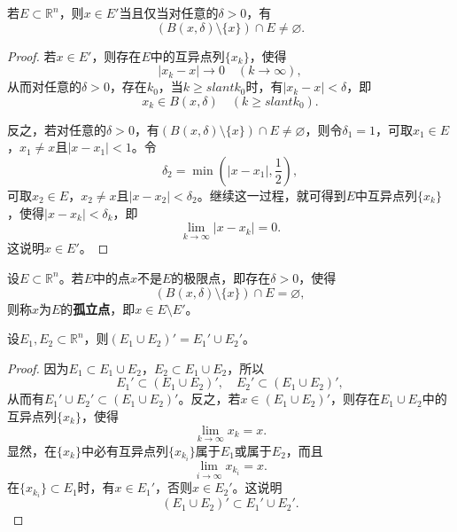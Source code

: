 \documentclass[../../main.tex]{subfiles}
\begin{document}
\begin{theorem}[一个点是极限点的充要条件]\label{theorem:一个点是极限点的充要条件}
若\(E\subset\mathbb{R}^n\)，则\(x\in E'\)当且仅当对任意的\(\delta>0\)，有
\[(B(x,\delta)\setminus\{x\})\cap E\neq\varnothing.\]
\end{theorem}
\begin{proof}
  若\(x\in E'\)，则存在\(E\)中的互异点列\(\{x_k\}\)，使得
\[|x_k - x|\to 0\quad(k\to\infty),\]
从而对任意的\(\delta>0\)，存在\(k_0\)，当\(k\geqslant slant k_0\)时，有\(|x_k - x|<\delta\)，即
\[x_k\in B(x,\delta)\quad(k\geqslant slant k_0).\]

反之，若对任意的\(\delta>0\)，有\((B(x,\delta)\setminus\{x\})\cap E\neq\varnothing\)，则令\(\delta_1 = 1\)，可取\(x_1\in E\)，\(x_1\neq x\)且\(|x - x_1|<1\)。令
\[\delta_2=\min\left(|x - x_1|,\frac{1}{2}\right),\]
可取\(x_2\in E\)，\(x_2\neq x\)且\(|x - x_2|<\delta_2\)。继续这一过程，就可得到\(E\)中互异点列\(\{x_k\}\)，使得\(|x - x_k|<\delta_k\)，即
\[\lim_{k\to\infty}|x - x_k| = 0.\]
这说明\(x\in E'\)。
\end{proof}

\begin{definition}[孤立点]\label{definition:孤立点}
  设\(E\subset\mathbb{R}^n\)。若\(E\)中的点\(x\)不是\(E\)的极限点，即存在\(\delta>0\)，使得
\[(B(x,\delta)\setminus\{x\})\cap E=\varnothing,\]
则称\(x\)为\(E\)的\textbf{孤立点}，即\(x\in E\setminus E'\)。
\end{definition}

\begin{theorem}[导集的性质]\label{theorem:导集的性质}
设\(E_1,E_2\subset\mathbb{R}^n\)，则\((E_1\cup E_2)' = E_1'\cup E_2'\)。
\end{theorem}
\begin{proof}
  因为\(E_1\subset E_1\cup E_2\)，\(E_2\subset E_1\cup E_2\)，所以
\[E_1'\subset (E_1\cup E_2)',\quad E_2'\subset (E_1\cup E_2)',\]
从而有\(E_1'\cup E_2'\subset (E_1\cup E_2)'\)。反之，若\(x\in (E_1\cup E_2)'\)，则存在\(E_1\cup E_2\)中的互异点列\(\{x_k\}\)，使得
\[\lim_{k\rightarrow\infty}x_k = x.\]
显然，在\(\{x_k\}\)中必有互异点列\(\{x_{k_i}\}\)属于\(E_1\)或属于\(E_2\)，而且
\[\lim_{i\rightarrow\infty}x_{k_i} = x.\]
在\(\{x_{k_i}\}\subset E_1\)时，有\(x\in E_1'\)，否则\(x\in E_2'\)。这说明
\[(E_1\cup E_2)'\subset E_1'\cup E_2'.\]
\end{proof}
\end{document}
